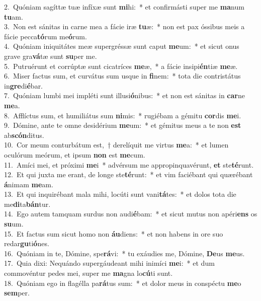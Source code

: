 {2.~}Quóniam sagíttæ tuæ infíxæ sunt \textbf{mi}hi:~* et confirmásti super me \textbf{ma}num \textbf{tu}am.\\
{3.~}Non est sánitas in carne mea a fácie iræ \textbf{tu}æ:~* non est pax óssibus meis a fácie pecca\textbf{tó}rum me\textbf{ó}rum.\\
{4.~}Quóniam iniquitátes meæ supergréssæ sunt caput \textbf{me}um:~* et sicut onus grave gra\textbf{vá}tæ sunt \textbf{su}per me.\\
{5.~}Putruérunt et corrúptæ sunt cicatríces \textbf{me}æ,~* a fácie insipi\textbf{én}tiæ \textbf{me}æ.\\
{6.~}Miser factus sum, et curvátus sum usque in \textbf{fi}nem:~* tota die contristátus in\textbf{gre}di\textbf{é}bar.\\
{7.~}Quóniam lumbi mei impléti sunt illusi\textbf{ó}nibus:~* et non est sánitas in \textbf{car}ne \textbf{me}a.\\
{8.~}Afflíctus sum, et humiliátus sum \textbf{ni}mis:~* rugiébam a gémitu \textbf{cor}dis \textbf{me}i.\\
{9.~}Dómine, ante te omne desidérium \textbf{me}um:~* et gémitus meus a te non \textbf{est} ab\textbf{scón}ditus.\\
{10.~}Cor meum conturbátum est,~† derelíquit me virtus \textbf{me}a:~* et lumen oculórum meórum, et ipsum \textbf{non} est \textbf{me}cum.\\
{11.~}Amíci mei, et próximi \textbf{me}i~* advérsum me appropinquavérunt, \textbf{et} ste\textbf{té}runt.\\
{12.~}Et qui juxta me erant, de longe ste\textbf{té}runt:~* et vim faciébant qui quærébant \textbf{á}nimam \textbf{me}am.\\
{13.~}Et qui inquirébant mala mihi, locúti sunt vani\textbf{tá}tes:~* et dolos tota die me\textbf{di}ta\textbf{bán}tur.\\
{14.~}Ego autem tamquam surdus non audi\textbf{é}bam:~* et sicut mutus non apéri\textbf{ens} os \textbf{su}um.\\
{15.~}Et factus sum sicut homo non \textbf{áu}diens:~* et non habens in ore suo redar\textbf{gu}ti\textbf{ó}nes.\\
{16.~}Quóniam in te, Dómine, spe\textbf{rá}vi:~* tu exáudies me, Dómine, \textbf{De}us \textbf{me}us.\\
{17.~}Quia dixi: Nequándo supergáudeant mihi inimíci \textbf{me}i:~* et dum commovéntur pedes mei, super me \textbf{ma}gna lo\textbf{cú}ti sunt.\\
{18.~}Quóniam ego in flagélla pa\textbf{rá}tus sum:~* et dolor meus in conspéctu \textbf{me}o \textbf{sem}per.\\
